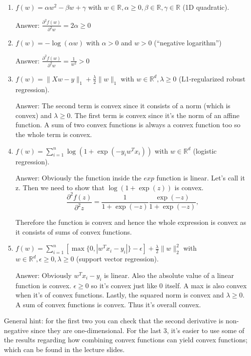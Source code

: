\documentclass{article}
\newenvironment{answer}{\par\begingroup\color{gre}Answer: }{\endgroup}
\def\R{\mathbb{R}}
\newcommand{\norm}[1]{\lVert #1 \rVert}
\begin{document}
\begin{enumerate}
\item $f(w) = \alpha w^2 - \beta w + \gamma$ with $w \in \R, \alpha \geq 0, \beta \in \R, \gamma \in \R$ (1D quadratic).
\begin{answer}
    $\frac{\partial^{2} f(w)}{\partial^2 w} = 2 \alpha \geq 0 $
\end{answer}
\item $f(w) = -\log(\alpha w) $ with $\alpha > 0$ and $w > 0$ (``negative logarithm'')
\begin{answer}
    $\frac{\partial^{2} f(w)}{\partial^2 w} = \frac{1}{w^2} > 0 $
\end{answer}
\item $f(w) = \norm{Xw-y}_1 + \frac{\lambda}{2}\norm{w}_1$ with $w \in \R^d, \lambda \geq 0$ (L1-regularized robust regression).
\begin{answer}
    The second term is convex since it consists of a norm (which is convex) and $\lambda \geq 0$. The first term is convex since it's
    the norm of an affine function. A sum of two convex functions is always a convex function too so the whole term is convex.
\end{answer}
\item $f(w) = \sum_{i=1}^n \log(1+\exp(-y_iw^Tx_i)) $ with $w \in \R^d$ (logistic regression).
\begin{answer}
    Obviously the function inside the $exp$ function is linear. Let's call it z. Then we need to show that $\log(1+\exp(z))$ is convex.
    \[
        \frac{\partial^{2} f(z)}{\partial^2 z} = \frac{1}{1+\exp(-z)}\frac{\exp(-z)}{1+\exp(-z)},
\] 

Therefore the function is convex and hence the whole expression is convex as it consists of sums of convex functions.
\end{answer}
\item $f(w) = \sum_{i=1}^n[\max\{0,|w^Tx_i - y_i|\} - \epsilon] + \frac{\lambda}{2}\norm{w}_2^2$  with $w \in \R^d, \epsilon \geq 0, \lambda \geq 0$ (support vector regression).

\begin{answer}
    Obviously $w^Tx_i - y_i$ is linear. Also the absolute value of a linear function is convex. $\epsilon \geq 0$ so it's convex just like 0 itself. 
    A max is also convex when it's of convex functions. Lastly, the squared norm is convex and $\lambda \geq 0$. A sum of convex functions is convex.
    Thus it's overall convex.  
\end{answer}
\end{enumerate}
General hint: for the first two you can check that the second derivative is non-negative since they are one-dimensional. For the last 3, it's easier to use some of the results regarding how combining convex functions can yield convex functions; which can be found in the lecture slides.
\end{document}
